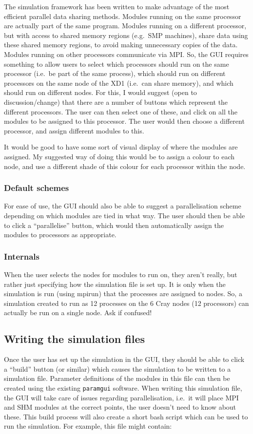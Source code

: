 \documentclass{article}
\begin{document}
The simulation framework has been written to make advantage of the
most efficient parallel data sharing methods.  Modules running on the
same processor are actually part of the same program.  Modules running
on a different processor, but with access to shared memory regions
(e.g.\ SMP machines), share data using these shared memory regions, to
avoid making unnecessary copies of the data.  Modules running on other
processors communicate via MPI.  So, the GUI requires something to
allow users to select which processors should run on the same
processor (i.e.\ be part of the same process), which should run on
different processors on the same node of the XD1 (i.e.\ can share
memory), and which should run on different nodes.  For this, I would
suggest (open to discussion/change) that there are a number of buttons
which represent the different processors.  The user can then select
one of these, and click on all the modules to be assigned to this
processor.  The user would then choose a different processor, and
assign different modules to this.  

It would be good to have some sort of visual display of where the
modules are assigned.  My suggested way of doing this would be to
assign a colour to each node, and use a different shade of this colour
for each processor within the node.  

\subsubsection{Default schemes}
For ease of use, the GUI should also be able to suggest a
parallelisation scheme depending on which modules are tied in what
way.  The user should then be able to click a ``parallelise'' button,
which would then automatically assign the modules to processors as
appropriate.

\subsubsection{Internals}
When the user selects the nodes for modules to run on, they aren't
really, but rather just specifying how the simulation file is set up.
It is only when the simulation is run (using mpirun) that the
processes are assigned to nodes.  So, a simulation created to run as
12 processes on the 6 Cray nodes (12 processors) can actually be run
on a single node.  Ask if confused!


\subsection{Writing the simulation files}
Once the user has set up the simulation in the GUI, they should be
able to click a ``build'' button (or similar) which causes the
simulation to be written to a simulation file.
Parameter definitions of the modules in this file can then be created
using the existing \texttt{paramgui} software.  When writing this
simulation file, the GUI will take care of issues regarding
parallelisation, i.e.\ it will place MPI and SHM modules at the
correct points, the user doesn't need to know about these.  This build
process will also create a short bash script which can be used to run
the simulation.  For example, this file might contain:
\end{document}
